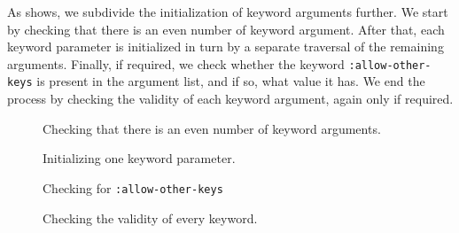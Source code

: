 As  shows, we subdivide the
initialization of keyword arguments further.  We start by checking
that there is an even number of keyword argument.  After that, each
keyword parameter is initialized in turn by a separate traversal of
the remaining arguments.  Finally, if required, we check whether the
keyword \texttt{:allow-other-keys} is present in the argument list,
and if so, what value it has.  We end the process by checking the
validity of each keyword argument, again only if required.

\begin{figure}
\begin{center}
\end{center}
\caption{\label{fig-check-even-keyword-arguments}
Checking that there is an even number of keyword arguments.}
\end{figure}

\begin{figure}
\begin{center}
\end{center}
\caption{\label{fig-initialize-one-keyword-parameter}
Initializing one keyword parameter.}
\end{figure}

\begin{figure}
\begin{center}
\end{center}
\caption{\label{fig-check-allow-other-keys}
Checking for \texttt{:allow-other-keys}}
\end{figure}

\begin{figure}
\begin{center}
\end{center}
\caption{\label{fig-check-every-keyword}
Checking the validity of every keyword.}
\end{figure}
